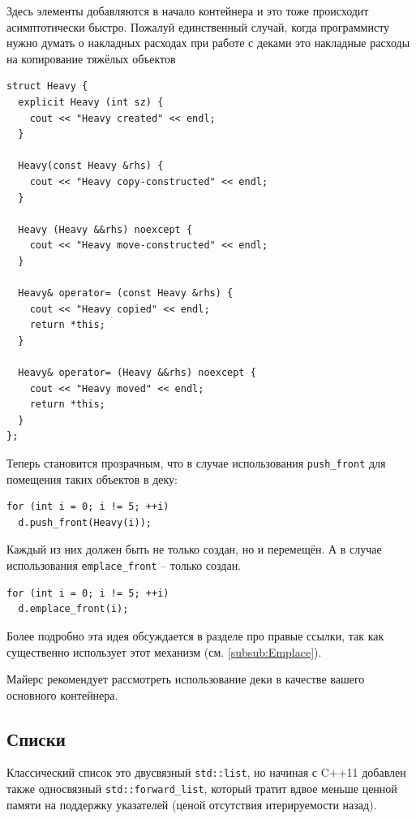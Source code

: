 \documentclass[a4paper,12pt,oneside]{book}
\begin{document}
Здесь элементы добавляются в начало контейнера и это тоже происходит асимптотически быстро. Пожалуй единственный случай, когда программисту нужно думать о накладных расходах при работе с деками это накладные расходы на копирование тяжёлых объектов

\begin{lstlisting}
struct Heavy {
  explicit Heavy (int sz) {
    cout << "Heavy created" << endl;
  }

  Heavy(const Heavy &rhs) {
    cout << "Heavy copy-constructed" << endl;
  }

  Heavy (Heavy &&rhs) noexcept {
    cout << "Heavy move-constructed" << endl;
  }

  Heavy& operator= (const Heavy &rhs) {
    cout << "Heavy copied" << endl;
    return *this;
  }

  Heavy& operator= (Heavy &&rhs) noexcept {
    cout << "Heavy moved" << endl;
    return *this;
  }
};
\end{lstlisting}

Теперь становится прозрачным, что в случае использования \lstinline!push_front! для помещения таких объектов в деку:

\begin{lstlisting}
for (int i = 0; i != 5; ++i)
  d.push_front(Heavy(i));
\end{lstlisting}

Каждый из них должен быть не только создан, но и перемещён. А в случае использования \lstinline!emplace_front! -- только создан.

\begin{lstlisting}
for (int i = 0; i != 5; ++i)
  d.emplace_front(i);
\end{lstlisting}

Более подробно эта идея обсуждается в разделе про правые ссылки, так как существенно использует этот механизм (см. \ref{subsub:Emplace}).

Майерс \cite{effmoderncpp} рекомендует рассмотреть использование деки в качестве вашего основного контейнера.

\subsection{Списки}

Классический список это двусвязный \lstinline!std::list!, но начиная с C++11 добавлен также односвязный \lstinline!std::forward_list!, который тратит вдвое меньше ценной памяти на поддержку указателей (ценой отсутствия итерируемости назад).
\end{document}
